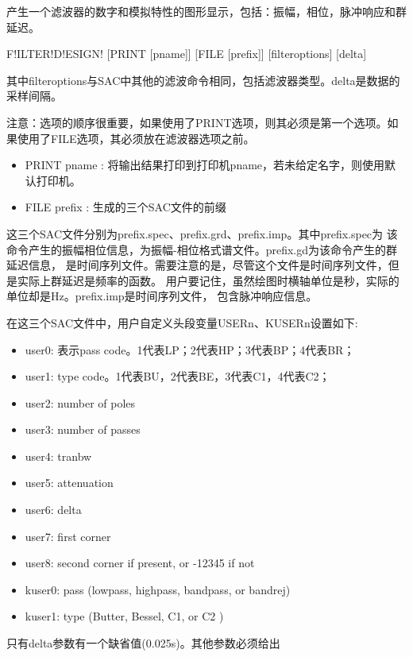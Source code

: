 \label{cmd:filterdesign}

产生一个滤波器的数字和模拟特性的图形显示，包括：振幅，相位，脉冲响应和群延迟。

\begin{SACSTX}
F!ILTER!D!ESIGN! [PRINT [pname]] [FILE [prefix]] [filteroptions] [delta]
\end{SACSTX}
其中filteroptions与SAC中其他的滤波命令相同，包括滤波器类型。delta是数据的采样间隔。

注意：选项的顺序很重要，如果使用了PRINT选项，则其必须是第一个选项。如果使用了FILE选项，其必须放在滤波器选项之前。

\begin{itemize}
\item PRINT pname : 将输出结果打印到打印机pname，若未给定名字，则使用默认打印机。
\item FILE prefix : 生成的三个SAC文件的前缀
\end{itemize}

这三个SAC文件分别为prefix.spec、prefix.grd、prefix.imp。其中prefix.spec为
该命令产生的振幅相位信息，为振幅-相位格式谱文件。prefix.gd为该命令产生的群延迟信息，
是时间序列文件。需要注意的是，尽管这个文件是时间序列文件，但是实际上群延迟是频率的函数。
用户要记住，虽然绘图时横轴单位是秒，实际的单位却是Hz。prefix.imp是时间序列文件，
包含脉冲响应信息。

在这三个SAC文件中，用户自定义头段变量USERn、KUSERn设置如下:
\begin{itemize}
\item user0: 表示pass code。1代表LP；2代表HP；3代表BP；4代表BR；
\item user1: type code。1代表BU，2代表BE，3代表C1，4代表C2；
\item user2:  number of poles
\item user3:  number of passes
\item user4:  tranbw
\item user5:  attenuation
\item user6:  delta
\item user7:  first corner
\item user8:  second corner if present, or -12345 if not
\item kuser0: pass (lowpass, highpass, bandpass, or bandrej)
\item kuser1: type (Butter, Bessel, C1, or C2 )
\end{itemize}

只有delta参数有一个缺省值(0.025s)。其他参数必须给出

